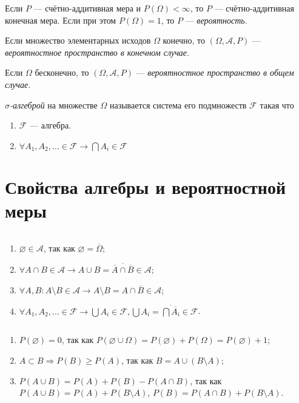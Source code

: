 \begin{define*}
  Если $P$ --- счётно-аддитивная мера и $P(\Omega) < \infty$, то $P$ --- счётно-аддитивная конечная мера.
  Если при этом $P(\Omega) = 1$, то $P$ --- \emph{вероятность}.
\end{define*}

\begin{define*}
  Если множество элементарных исходов $\Omega$ конечно, то $(\Omega, \mathcal{A}, P)$ --- \emph{вероятностное пространство в конечном случае}.

  Если $\Omega$ бесконечно, то $(\Omega, \mathcal{A}, P)$ ---  \emph{вероятностное пространство в общем случае}.
\end{define*}

\begin{define*}
  \emph{$\sigma$-алгеброй} на множестве $\Omega$ называется система его подмножеств $\mathcal{F}$ такая что
  \begin{enumerate}
	\item $\mathcal{F} $ --- алгебра.
	\item $\forall	A_1, A_2, \ldots \in \mathcal{F} \to \bigcap A_i \in \mathcal{F}$
  \end{enumerate}
\end{define*}

\section*{Свойства алгебры и вероятностной меры}

\begin{remark*} $ $
  \begin{enumerate}
	\item $\varnothing \in \mathcal{A}$, так как $\varnothing = \overline{\Omega}$;
	\item $\forall A \cap B \in \mathcal{A}  \to  A \cup B = \overline{ \overline{A} \cap \overline{B} } \in \mathcal{A}$;
	\item $\forall A, B: A \setminus B \in \mathcal{A} \to A \setminus B = A \cap \overline{B} \in \mathcal{A} $;
	\item $\forall A_1, A_2, \ldots \in \mathcal{F}  \to \bigcup A_i \in \mathcal{F}, \bigcup A_i = \overline{\bigcap\overline{A_i}} \in \mathcal{F}$.
  \end{enumerate}
\end{remark*}

\begin{remark*} $ $
  \begin{enumerate}
	\item $P(\varnothing) = 0$, так как $P(\varnothing \cup \Omega) = P(\varnothing) + P(\Omega) = P(\varnothing) + 1$;
	\item $A \subset B \Rightarrow P(B) \ge P(A)$, так как $B = A \cup (B\setminus A)$;
	\item $P(A \cup B) = P(A) + P(B) - P(A \cap B)$, так как $P(A\cup B) = P(A) + P(B\setminus A)$, $P(B) = P(A \cap B) + P(B \setminus A)$.
  \end{enumerate}
\end{remark*}


